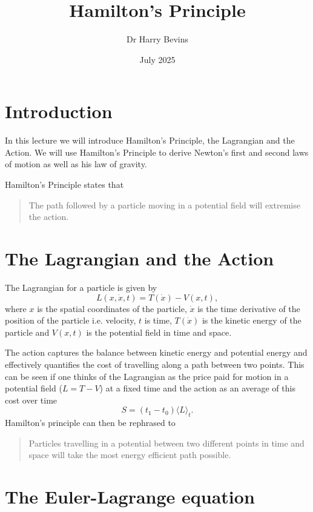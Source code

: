 \documentclass{article}
\title{Hamilton's Principle}
\author{Dr Harry Bevins}
\date{July 2025}
\begin{document}
\maketitle

\section{Introduction}

In this lecture we will introduce Hamilton's Principle, the Lagrangian and the Action. We will use Hamilton's Principle to derive Newton's first and second laws of motion as well as his law of gravity. 

Hamilton's Principle states that 

\begin{quotation}
    The path followed by a particle moving in a potential field will extremise the action.
\end{quotation}

\section{The Lagrangian and the Action}

The Lagrangian for a particle is given by
\begin{equation}
L(x, \dot{x}, t) = T(\dot{x}) - V(x, t),
\end{equation}
where $x$ is the spatial coordinates of the particle, $\dot{x}$ is the time derivative of the position of the particle i.e. velocity, $t$ is time, $T(\dot{x})$ is the kinetic energy of the particle and $V(x, t)$ is the potential field in time and space.


The action captures the balance between kinetic energy and potential energy and effectively quantifies the cost of travelling along a path between two points. This can be seen if one thinks of the Lagrangian as the price paid for motion in a potential field ($L = T - V$) at a fixed time and the action as an average of this cost over time
\begin{equation}
    S = (t_1 - t_0) \langle L \rangle_t.
\end{equation}
Hamilton's principle can then be rephrased to
\begin{quote}
    Particles travelling in a potential between two different points in time and space will take the most energy efficient path possible.
\end{quote}

\section{The Euler-Lagrange equation}
\end{document}
